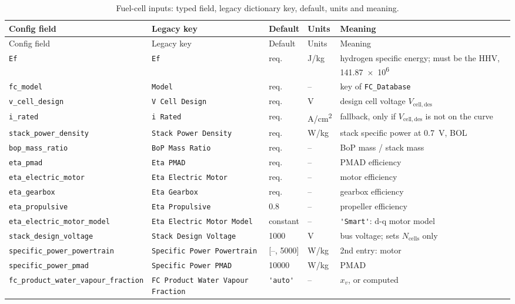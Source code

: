 \documentclass[a4paper,11pt]{article}
\newcommand{\code}[1]{\nolinkurl{#1}}
\newcommand{\Vdes}{V_\mathrm{cell,des}}
\begin{document}
\begingroup\small
\setlength{\tabcolsep}{4pt}
\begin{longtable}{@{}p{3.6cm}p{3.6cm}p{1.9cm}p{1.1cm}p{4.3cm}@{}}
\caption{Fuel-cell inputs: typed field, legacy dictionary key, default, units and meaning.}
\label{tab:inputs}\\
\toprule
Config field & Legacy key & Default & Units & Meaning \\
\midrule
\endfirsthead
\toprule
Config field & Legacy key & Default & Units & Meaning \\
\midrule
\endhead
\bottomrule
\endfoot
\code{Ef} & \code{Ef} & req. & J/kg & hydrogen specific energy; must be the HHV, \num{141.87e6} \\
\code{fc_model} & \code{Model} & req. & -- & key of \code{FC_Database} \\
\code{v_cell_design} & \code{V Cell Design} & req. & V & design cell voltage $\Vdes$ \\
\code{i_rated} & \code{i Rated} & req. & \si{A/cm^2} & fallback, only if $\Vdes$ is not on the curve \\
\code{stack_power_density} & \code{Stack Power Density} & req. & W/kg & stack specific power at \SI{0.7}{V}, BOL \\
\code{bop_mass_ratio} & \code{BoP Mass Ratio} & req. & -- & BoP mass / stack mass \\
\code{eta_pmad} & \code{Eta PMAD} & req. & -- & PMAD efficiency \\
\code{eta_electric_motor} & \code{Eta Electric Motor} & req. & -- & motor efficiency \\
\code{eta_gearbox} & \code{Eta Gearbox} & req. & -- & gearbox efficiency \\
\code{eta_propulsive} & \code{Eta Propulsive} & 0.8 & -- & propeller efficiency \\
\code{eta_electric_motor_model} & \code{Eta Electric Motor Model} & constant & -- & \code{'Smart'}: d-q motor model \\
\code{stack_design_voltage} & \code{Stack Design Voltage} & 1000 & V & bus voltage; sets $N_\mathrm{cells}$ only \\
\code{specific_power_powertrain} & \code{Specific Power Powertrain} & [--, 5000] & W/kg & 2nd entry: motor \\
\code{specific_power_pmad} & \code{Specific Power PMAD} & 10000 & W/kg & PMAD \\
\code{fc_product_water_vapour_fraction} & \code{FC Product Water Vapour Fraction} & \code{'auto'} & -- & $x_v$, or computed \\

\end{longtable}
\end{document}
